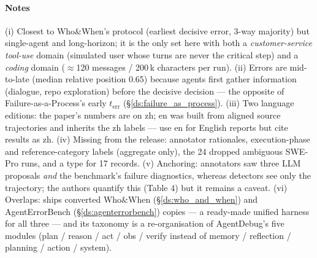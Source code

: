 \paragraph{Notes} (i) Closest to Who\&When's protocol (earliest decisive error, 3-way majority) but single-agent and long-horizon; it is the only set here with both a \emph{customer-service tool-use} domain (simulated user whose turns are never the critical step) and a \emph{coding} domain ($\approx$120 messages / 200\,k characters per run). (ii) Errors are mid-to-late (median relative position 0.65) because agents first gather information (dialogue, repo exploration) before the decisive decision --- the opposite of Failure-as-a-Process's early $t_{\mathrm{err}}$ (\S\ref{ds:failure_as_process}). (iii) Two language editions: the paper's numbers are on zh; en was built from aligned source trajectories and inherits the zh labels --- use en for English reports but cite results as zh. (iv) Missing from the release: annotator rationales, execution-phase and reference-category labels (aggregate only), the 24 dropped ambiguous SWE-Pro runs, and a type for 17 records. (v) Anchoring: annotators saw three LLM proposals \emph{and} the benchmark's failure diagnostics, whereas detectors see only the trajectory; the authors quantify this (Table 4) but it remains a caveat. (vi) Overlaps: ships converted Who\&When (\S\ref{ds:who_and_when}) and AgentErrorBench (\S\ref{ds:agenterrorbench}) copies --- a ready-made unified harness for all three --- and its taxonomy is a re-organisation of AgentDebug's five modules (plan / reason / act / obs / verify instead of memory / reflection / planning / action / system).
